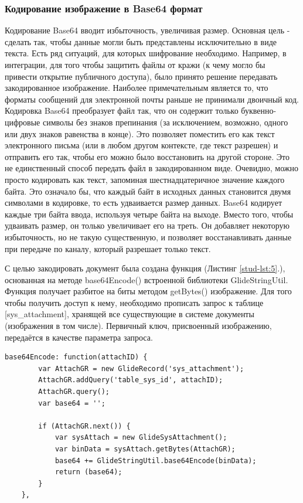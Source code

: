 \documentclass[14pt]{mmcs_article}
\begin{document}
\subsubsection{Кодирование изображение в Base64 формат}
 Кодирование Base64 вводит избыточность, увеличивая размер. Основная цель - сделать так, чтобы данные могли быть представлены исключительно в виде текста. Есть ряд ситуаций, для которых шифрование необходимо. Например, в интеграции, для того чтобы защитить файлы от кражи (к чему могло бы привести открытие публичного доступа), было принято решение передавать закодированное изображение. Наиболее примечательным является то, что форматы сообщений для электронной почты раньше не принимали двоичный код. Кодировка Base64 преобразует файл так, что он содержит только буквенно-цифровые символы без знаков препинания (за исключением, возможно, одного или двух знаков равенства в конце). Это позволяет поместить его как текст электронного письма (или в любом другом контексте, где текст разрешен) и отправить его так, чтобы его можно было восстановить на другой стороне. Это не единственный способ передать файл в закодированном виде. Очевидно, можно просто кодировать как текст, запоминая шестнадцатеричное значение каждого байта. Это означало бы, что каждый байт в исходных данных становится двумя символами в кодировке, то есть удваивается размер данных. Base64 кодирует каждые три байта ввода, используя четыре байта на выходе. Вместо того, чтобы удваивать размер, он только увеличивает его на треть. Он добавляет некоторую избыточность, но не такую существенную, и позволяет восстанавливать данные при передаче по каналу, который разрешает только текст.

С целью закодировать документ была создана функция (Листинг \ref{stud-lst:5}.), основанная на методе base64Encode() встроенной библиотеки GlideStringUtil. Функция получает разбитое на биты методом getBytes() изображение. Для того чтобы получить доступ к нему, необходимо прописать запрос к таблице [sys\_attachment], хранящей все существующие в системе документы (изображения в том числе). Первичный ключ, присвоенный изображению, передаётся в качестве параметра запроса.
\begin{lstlisting}[caption=Base64 кодирование, label=stud-lst:5]
 base64Encode: function(attachID) {
        var AttachGR = new GlideRecord('sys_attachment');
        AttachGR.addQuery('table_sys_id', attachID);
        AttachGR.query();
        var base64 = '';

        if (AttachGR.next()) {
            var sysAttach = new GlideSysAttachment();
            var binData = sysAttach.getBytes(AttachGR);
            base64 += GlideStringUtil.base64Encode(binData);
            return (base64);
        }
    },
\end{lstlisting}
\end{document}
